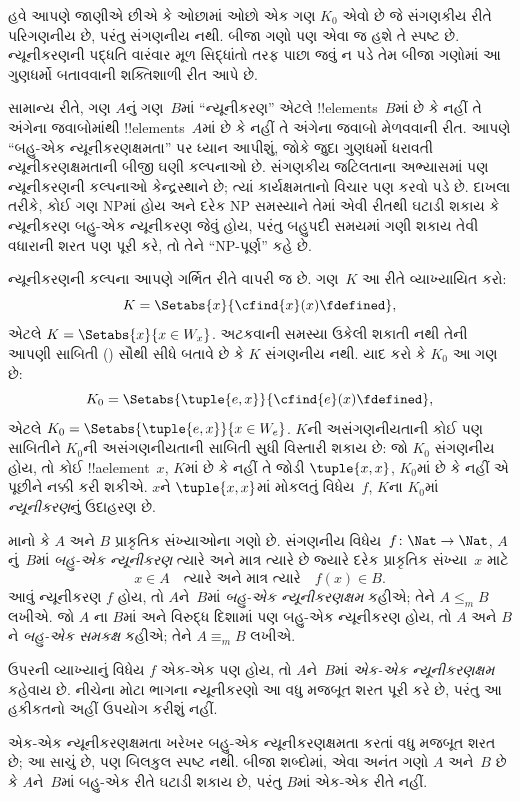 \documentclass[../../../include/open-logic-section]{subfiles}
\begin{document}

\begin{explain}
હવે આપણે જાણીએ છીએ કે ઓછામાં ઓછો એક ગણ $K_0$ એવો છે જે
સંગણકીય રીતે પરિગણનીય છે, પરંતુ સંગણનીય નથી. બીજા ગણો પણ
એવા જ હશે તે સ્પષ્ટ છે. ન્યૂનીકરણની પદ્ધતિ વારંવાર મૂળ
સિદ્ધાંતો તરફ પાછા જવું ન પડે તેમ બીજા ગણોમાં આ ગુણધર્મો
બતાવવાની શક્તિશાળી રીત આપે છે.

સામાન્ય રીતે, ગણ $A$નું ગણ~$B$માં ``ન્યૂનીકરણ'' એટલે
!!{element}s~$B$માં છે કે નહીં તે અંગેના જવાબોમાંથી
!!{element}s~$A$માં છે કે નહીં તે અંગેના જવાબો મેળવવાની
રીત. આપણે ``બહુ-એક ન્યૂનીકરણક્ષમતા'' પર ધ્યાન આપીશું,
જોકે જુદા ગુણધર્મો ધરાવતી ન્યૂનીકરણક્ષમતાની બીજી ઘણી
કલ્પનાઓ છે. સંગણકીય જટિલતાના અભ્યાસમાં પણ ન્યૂનીકરણની
કલ્પનાઓ કેન્દ્રસ્થાને છે; ત્યાં કાર્યક્ષમતાનો વિચાર પણ
કરવો પડે છે. દાખલા તરીકે, કોઈ ગણ NPમાં હોય અને દરેક NP
સમસ્યાને તેમાં એવી રીતથી ઘટાડી શકાય કે ન્યૂનીકરણ બહુ-એક
ન્યૂનીકરણ જેવું હોય, પરંતુ બહુપદી સમયમાં ગણી શકાય તેવી
વધારાની શરત પણ પૂરી કરે, તો તેને ``NP-પૂર્ણ'' કહે છે.

ન્યૂનીકરણની કલ્પના આપણે ગર્ભિત રીતે વાપરી જ છે. ગણ~$K$
આ રીતે વ્યાખ્યાયિત કરો:
\[
K = \Setabs{x}{\cfind{x}(x) \fdefined},
\]
એટલે $K = \Setabs{x}{x \in W_x}$. અટકવાની સમસ્યા
ઉકેલી શકાતી નથી તેની આપણી સાબિતી
() સૌથી સીધે બતાવે છે કે
$K$ સંગણનીય નથી. યાદ કરો કે $K_0$ આ ગણ છે:
\[
K_0 = \Setabs{\tuple{e, x}}{\cfind{e}(x) \fdefined },
\]
એટલે $K_0 = \Setabs{\tuple{e,x}}{x \in W_e}$.
$K$ની અસંગણનીયતાની કોઈ પણ સાબિતીને $K_0$ની
અસંગણનીયતાની સાબિતી સુધી વિસ્તારી શકાય છે: જો $K_0$
સંગણનીય હોય, તો કોઈ !!a{element}~$x$, $K$માં છે કે નહીં
તે જોડી $\tuple{x, x}$, $K_0$માં છે કે નહીં એ પૂછીને નક્કી
કરી શકીએ. $x$ને $\tuple{x, x}$માં મોકલતું વિધેય~$f$,
$K$ના $K_0$માં \emph{ન્યૂનીકરણ}નું ઉદાહરણ છે.
\end{explain}

\begin{defn}
માનો કે $A$ અને $B$ પ્રાકૃતિક સંખ્યાઓના ગણો છે.
સંગણનીય વિધેય~$f\colon \Nat \to \Nat$, $A$નું~$B$માં
\emph{બહુ-એક ન્યૂનીકરણ} ત્યારે અને માત્ર ત્યારે છે જ્યારે
દરેક પ્રાકૃતિક સંખ્યા~$x$ માટે
\[
x \in A \quad \text{ત્યારે અને માત્ર ત્યારે} \quad f(x) \in B.
\]
આવું ન્યૂનીકરણ $f$ હોય, તો $A$ને~$B$માં \emph{બહુ-એક
ન્યૂનીકરણક્ષમ} કહીએ; તેને $A \leq_m B$ લખીએ. જો $A$
ના $B$માં અને વિરુદ્ધ દિશામાં પણ બહુ-એક ન્યૂનીકરણ હોય,
તો $A$ અને $B$ને \emph{બહુ-એક સમકક્ષ} કહીએ; તેને
$A \equiv_m B$ લખીએ.
\end{defn}

ઉપરની વ્યાખ્યાનું વિધેય $f$ એક-એક પણ હોય, તો $A$ને~$B$માં
\emph{એક-એક ન્યૂનીકરણક્ષમ} કહેવાય છે. નીચેના મોટા ભાગના
ન્યૂનીકરણો આ વધુ મજબૂત શરત પૂરી કરે છે, પરંતુ આ હકીકતનો
અહીં ઉપયોગ કરીશું નહીં.

\begin{digress}
એક-એક ન્યૂનીકરણક્ષમતા ખરેખર બહુ-એક ન્યૂનીકરણક્ષમતા કરતાં
વધુ મજબૂત શરત છે; આ સાચું છે, પણ બિલકુલ સ્પષ્ટ નથી.
બીજા શબ્દોમાં, એવા અનંત ગણો $A$ અને~$B$ છે કે $A$ને~$B$માં
બહુ-એક રીતે ઘટાડી શકાય છે, પરંતુ $B$માં એક-એક રીતે નહીં.
\end{digress}
\end{document}
